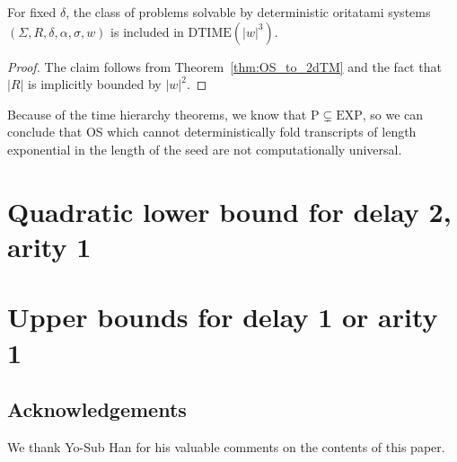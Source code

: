 \documentclass[runningheads]{llncs}
\begin{document}
\begin{corollary}\label{cor:DTIME3}
	For fixed $\delta$, the class of problems solvable by deterministic oritatami systems $(\Sigma, R, \delta, \alpha, \sigma, w)$ is included in $\mathrm{DTIME}(|w|^3)$.
\end{corollary}
\begin{proof}
	The claim follows from Theorem~\ref{thm:OS_to_2dTM} and the fact that $|R|$ is implicitly bounded by $|w|^2$.
\end{proof}



Because of the time hierarchy theorems, we know that $\mathrm{P}\subsetneq \mathrm{EXP}$, so we can conclude that OS which cannot deterministically fold transcripts of length exponential in the length of the seed are not computationally universal.


\section{Quadratic lower bound for delay 2, arity 1}\label{sect:lower}





%



\section{Upper bounds for delay 1 or arity 1}






\subsection*{Acknowledgements}
We thank Yo-Sub Han for his valuable comments on the contents of this paper. 



  
\end{document}
